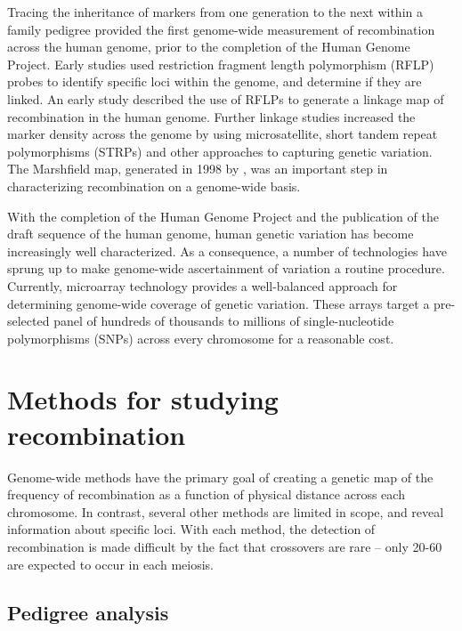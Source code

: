 Tracing the inheritance of markers from one generation to the next within a family pedigree provided the first genome-wide measurement of recombination across the human genome, prior to the completion of the Human Genome Project.
Early studies used restriction fragment length polymorphism (RFLP) probes to identify specific loci within the genome, and determine if they are linked.
An early study described the use of RFLPs to generate a linkage map of recombination in the human genome\cite{Botstein1980}.
Further linkage studies increased the marker density across the genome by using microsatellite, short tandem repeat polymorphisms (STRPs) and other approaches to capturing genetic variation\cite{Morton1991,Matise1994,Dib1996}.
The Marshfield map, generated in 1998 by \citet{Broman1998}, was an important step in characterizing recombination on a genome-wide basis.

With the completion of the Human Genome Project and the publication of the draft sequence of the human genome\cite{Venter2001,Lander2001}, human genetic variation has become increasingly well characterized.
As a consequence, a number of technologies have sprung up to make genome-wide ascertainment of variation a routine procedure.
Currently, microarray technology provides a well-balanced approach for determining genome-wide coverage of genetic variation.
These arrays target a pre-selected panel of hundreds of thousands to millions of single-nucleotide polymorphisms (SNPs) across every chromosome for a reasonable cost.

\section{Methods for studying recombination}

Genome-wide methods have the primary goal of creating a genetic map of the frequency of recombination as a function of physical distance across each chromosome.
In contrast, several other methods are limited in scope, and reveal information about specific loci.
With each method, the detection of recombination is made difficult by the fact that crossovers are rare -- only 20-60 are expected to occur in each meiosis.


\subsection{Pedigree analysis}

